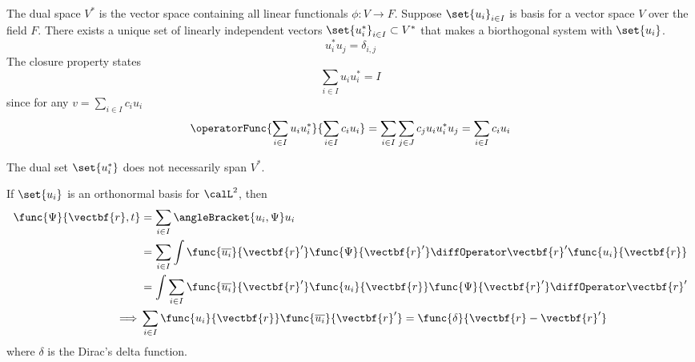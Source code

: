 The dual space \(V^{\ast}\) is the vector space containing all linear functionals \(\phi: V \to F\). Suppose \(\set{u_i}_{i \in I}\) is basis for a vector space \(V\) over the field \(F\). There exists a unique set of linearly independent vectors \(\set{u_i^{\ast}}_{i \in I} \subset V^{\ast}\) that makes a biorthogonal system with \(\set{u_i}\).
\begin{equation*}
    u^{\ast}_i u_j = \delta_{i,j}
\end{equation*}
The closure property states
\begin{equation*}
    \sum_{i \in I} u_i u_i^{\ast} = I
\end{equation*}
since for any \(v = \sum_{i \in I} c_i u_i\)
\begin{equation*}
    \operatorFunc{\sum_{i \in I} u_i u_i^{\ast}}{\sum_{i \in I} c_i u_i} = \sum_{i \in I}\sum_{j \in J} c_j u_i  u^{\ast}_i u_j = \sum_{i \in I} c_i u_i
\end{equation*}
\begin{remark}
    The dual set \(\set{u^{\ast}_i}\) does not necessarily span \(V^{\ast}\).
\end{remark}
If \(\set{u_i}\) is an orthonormal basis for \(\calL^2\), then
\begin{align*}
    \func{\Psi}{\vectbf{r},t} & = \sum_{i \in I} \angleBracket{u_i,\Psi} u_i                                                                                      \\
                              & =\sum_{i \in I} \int \func{\overline{u_i}}{\vectbf{r}'} \func{\Psi}{\vectbf{r}'} \diffOperator \vectbf{r}' \func{u_i}{\vectbf{r}} \\
                              & =\int \sum_{i \in I} \func{\overline{u_i}}{\vectbf{r}'} \func{u_i}{\vectbf{r}} \func{\Psi}{\vectbf{r}'} \diffOperator \vectbf{r}' \\
    \implies                  & \sum_{i \in I} \func{u_i}{\vectbf{r}} \func{\overline{u_i}}{\vectbf{r}'} = \func{\delta}{\vectbf{r}- \vectbf{r}'}
\end{align*}
where \(\delta\) is the Dirac's delta function.
